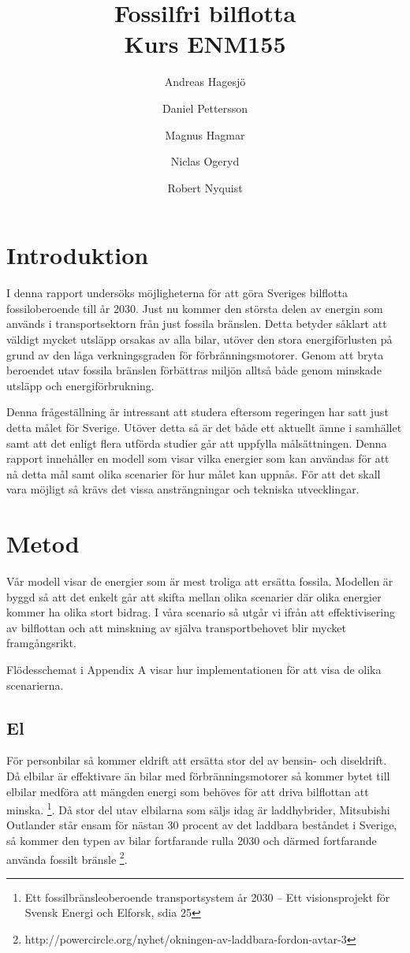 \documentclass[a4paper,11pt,fleqn, titlepage]{article}
\author{Andreas Hagesjö \and Daniel Pettersson \and
Magnus Hagmar \and Niclas Ogeryd \and Robert Nyquist}
\title{Fossilfri bilflotta \\ Kurs ENM155}
\begin{document}
\maketitle

\section{Introduktion}
I denna rapport undersöks möjligheterna för att göra Sveriges bilflotta fossiloberoende till år 2030. Just nu kommer den största delen av energin som används i transportsektorn från just fossila bränslen. Detta betyder såklart att väldigt mycket utsläpp orsakas av alla bilar, utöver den stora energiförlusten på grund av den låga verkningsgraden för förbränningsmotorer. Genom att bryta beroendet utav fossila bränslen förbättras miljön alltså både genom minskade utsläpp och energiförbrukning.

Denna frågeställning är intressant att studera eftersom regeringen har satt just detta målet för Sverige. Utöver detta så är det både ett aktuellt ämne i samhället samt att det enligt flera utförda studier går att uppfylla målsättningen. Denna rapport innehåller en modell som visar vilka energier som kan användas för att nå detta mål samt olika scenarier för hur målet kan uppnås. För att det skall vara möjligt så krävs det vissa ansträngningar och tekniska utvecklingar. 

\section{Metod}

Vår modell visar de energier som är mest troliga att ersätta fossila. Modellen är byggd så att det enkelt går att skifta mellan olika scenarier där olika energier kommer ha olika stort bidrag.
I våra scenario så utgår vi ifrån att effektivisering av bilflottan och att minskning av själva transportbehovet blir mycket framgångsrikt.


Flödesschemat i Appendix A visar hur implementationen för att visa de olika scenarierna.

\subsection{El}

För personbilar så kommer eldrift att ersätta stor del av bensin- och diseldrift.  Då elbilar är effektivare än bilar med förbränningsmotorer så kommer bytet till elbilar medföra att mängden energi som behöves för att driva bilflottan att minska. \footnote{Ett fossilbränsleoberoende transportsystem år 2030 – Ett visionsprojekt för Svensk Energi och Elforsk, sdia 25}.
Då stor del utav elbilarna som säljs idag är laddhybrider, Mitsubishi Outlander står ensam för nästan 30 procent av det laddbara beståndet i Sverige, så kommer den typen av bilar fortfarande rulla 2030 och därmed fortfarande använda fossilt bränsle \footnote{http://powercircle.org/nyhet/okningen-av-laddbara-fordon-avtar-3}.
\end{document}
